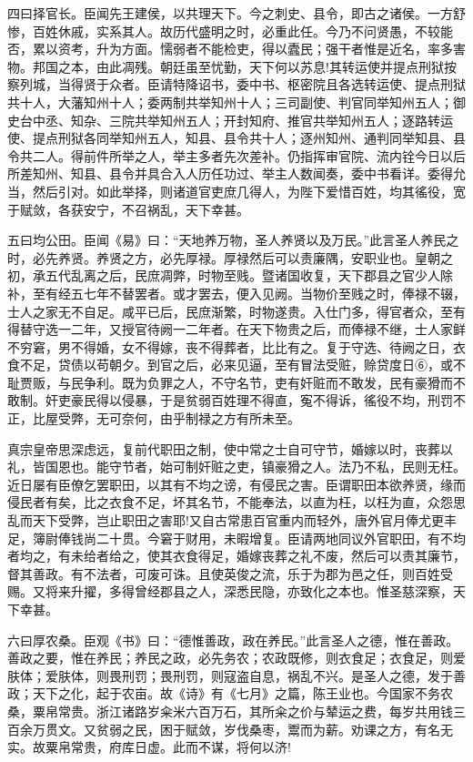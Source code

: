 \documentclass[UTF8,titlepage,oneside]{ctexbook}
\begin{document}
四曰择官长。臣闻先王建侯，以共理天下。今之刺史、县令，即古之诸侯。一方舒惨，百姓休戚，实系其人。故历代盛明之时，必重此任。今乃不问贤愚，不较能否，累以资考，升为方面。懦弱者不能检吏，得以蠹民；强干者惟是近名，率多害物。邦国之本，由此凋残。朝廷虽至忧勤，天下何以苏息!其转运使并提点刑狱按察列城，当得贤于众者。臣请特降诏书，委中书、枢密院且各选转运使、提点刑狱共十人，大藩知州十人；委两制共举知州十人；三司副使、判官同举知州五人；御史台中丞、知杂、三院共举知州五人；开封知府、推官共举知州五人；逐路转运使、提点刑狱各同举知州五人，知县、县令共十人；逐州知州、通判同举知县、县令共二人。得前件所举之人，举主多者先次差补。仍指挥审官院、流内铨今日以后所差知州、知县、县令并具合入人历任功过、举主人数闻奏，委中书看详。委得允当，然后引对。如此举择，则诸道官吏庶几得人，为陛下爱惜百姓，均其徭役，宽于赋敛，各获安宁，不召祸乱，天下幸甚。


五曰均公田。臣闻《易》曰：“天地养万物，圣人养贤以及万民。”此言圣人养民之时，必先养贤。养贤之方，必先厚禄。厚禄然后可以责廉隅，安职业也。皇朝之初，承五代乱离之后，民庶凋弊，时物至贱。暨诸国收复，天下郡县之官少人除补，至有经五七年不替罢者。或才罢去，便入见阙。当物价至贱之时，俸禄不辍，士人之家无不自足。咸平已后，民庶渐繁，时物遂贵。入仕门多，得官者众，至有得替守选一二年，又授官待阙一二年者。在天下物贵之后，而俸禄不继，士人家鲜不穷窘，男不得婚，女不得嫁，丧不得葬者，比比有之。复于守选、待阙之日，衣食不足，贷债以苟朝夕。到官之后，必来见逼，至有冒法受赃，赊贷度日⑥，或不耻贾贩，与民争利。既为负罪之人，不守名节，吏有奸赃而不敢发，民有豪猾而不敢制。奸吏豪民得以侵暴，于是贫弱百姓理不得直，寃不得诉，徭役不均，刑罚不正，比屋受弊，无可奈何，由乎制禄之方有所未至。


真宗皇帝思深虑远，复前代职田之制，使中常之士自可守节，婚嫁以时，丧葬以礼，皆国恩也。能守节者，始可制奸赃之吏，镇豪猾之人。法乃不私，民则无枉。近日屡有臣僚乞罢职田，以其有不均之谤，有侵民之害。臣谓职田本欲养贤，缘而侵民者有矣，比之衣食不足，坏其名节，不能奉法，以直为枉，以枉为直，众怨思乱而天下受弊，岂止职田之害耶!又自古常患百官重内而轻外，唐外官月俸尤更丰足，簿尉俸钱尚二十贯。今窘于财用，未暇增复。臣请两地同议外官职田，有不均者均之，有未给者给之，使其衣食得足，婚嫁丧葬之礼不废，然后可以责其廉节，督其善政。有不法者，可废可诛。且使英俊之流，乐于为郡为邑之任，则百姓受赐。又将来升擢，多得曾经郡县之人，深悉民隐，亦致化之本也。惟圣慈深察，天下幸甚。


六曰厚农桑。臣观《书》曰：“德惟善政，政在养民。”此言圣人之德，惟在善政。善政之要，惟在养民；养民之政，必先务农；农政既修，则衣食足；衣食足，则爱肤体；爱肤体，则畏刑罚；畏刑罚，则寇盗自息，祸乱不兴。是圣人之德，发于善政；天下之化，起于农亩。故《诗》有《七月》之篇，陈王业也。今国家不务农桑，粟帛常贵。浙江诸路岁籴米六百万石，其所籴之价与辇运之费，每岁共用钱三百余万贯文。又贫弱之民，困于赋敛，岁伐桑枣，鬻而为薪。劝课之方，有名无实。故粟帛常贵，府库日虚。此而不谋，将何以济!
\end{document}
